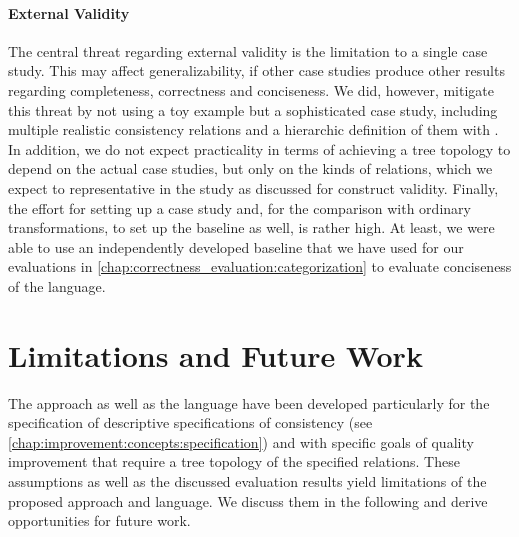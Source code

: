 \paragraph{External Validity}
The central threat regarding external validity is the limitation to a single case study.
This may affect generalizability, if other case studies produce other results regarding completeness, correctness and conciseness.
We did, however, mitigate this threat by not using a toy example but a sophisticated case study, including multiple realistic consistency relations and a hierarchic definition of them with \commonalities.
In addition, we do not expect practicality in terms of achieving a tree topology to depend on the actual case studies, but only on the kinds of relations, which we expect to representative in the study as discussed for construct validity.
Finally, the effort for setting up a case study and, for the comparison with ordinary transformations, to set up the baseline as well, is rather high.
At least, we were able to use an independently developed baseline that we have used for our evaluations in \autoref{chap:correctness_evaluation:categorization} to evaluate conciseness of the \commonalities language.



\section{Limitations and Future Work}

The \commonalities approach as well as the \commonalities language have been developed particularly for the specification of descriptive specifications of consistency (see \autoref{chap:improvement:concepts:specification}) and with specific goals of quality improvement that require a tree topology of the specified relations.
These assumptions as well as the discussed evaluation results yield limitations of the proposed approach and language.
We discuss them in the following and derive opportunities for future work.

